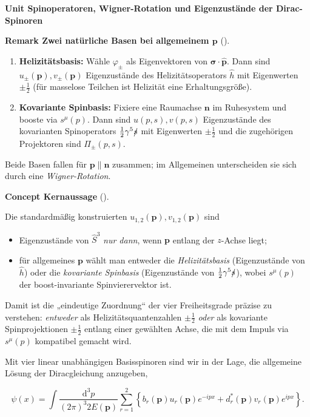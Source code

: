 \documentclass[10pt, letterpaper]{article}
\newcommand{\CustomHeading}[3]{%
  \par\medskip\noindent%
  \textbf{#1 #2} \textnormal{(#3)}.\enskip%
}
\newenvironment{REM}[2]{\begin{unitbox}\CustomHeading{Remark}{#1}{#2}}{\end{unitbox}}
\newenvironment{CONC}[2]{\begin{unitbox}\CustomHeading{Concept}{#1}{#2}}{\end{unitbox}}
\newenvironment{unit}[1]
  {\begin{unitbox}\textbf{Unit #1}\par\smallskip}
  {\end{unitbox}}
\begin{document}
\begin{unit}{Spinoperatoren, Wigner-Rotation und Eigenzustände der Dirac-Spinoren}
\begin{REM}{Zwei natürliche Basen bei allgemeinem $\mathbf p$}{}
\begin{enumerate}[label=\roman*)]
\item \textbf{Helizitätsbasis:} Wähle $\varphi_\pm$ als Eigenvektoren von $\boldsymbol{\sigma}\cdot \hat{\mathbf p}$. Dann sind $u_\pm(\mathbf p),v_\pm(\mathbf p)$ Eigenzustände des Helizitätsoperators $\hat h$ mit Eigenwerten $\pm\tfrac12$ (für masselose Teilchen ist Helizität eine Erhaltungsgröße).
\item \textbf{Kovariante Spinbasis:} Fixiere eine Raumachse $\mathbf n$ im Ruhesystem und booste via $s^\mu(p)$. Dann sind $u(p,s),v(p,s)$ Eigenzustände des kovarianten Spinoperators $\tfrac12\gamma^5\slashed{s}$ mit Eigenwerten $\pm\tfrac12$ und die zugehörigen Projektoren sind $\Pi_\pm(p,s)$.
\end{enumerate}
Beide Basen fallen für $\mathbf p\parallel\mathbf n$ zusammen; im Allgemeinen unterscheiden sie sich durch eine \emph{Wigner-Rotation}.
\end{REM}

\begin{CONC}{Kernaussage}{}
Die standardmäßig konstruierten $u_{1,2}(\mathbf p),v_{1,2}(\mathbf p)$ sind
\begin{itemize}
\item Eigenzustände von $\hat S^3$ \emph{nur dann}, wenn $\mathbf p$ entlang der $z$-Achse liegt;
\item für allgemeines $\mathbf p$ wählt man entweder die \emph{Helizitätsbasis} (Eigenzustände von $\hat h$) oder die \emph{kovariante Spinbasis} (Eigenzustände von $\tfrac12\gamma^5\slashed{s}$), wobei $s^\mu(p)$ der boost-invariante Spinvierervektor ist.
\end{itemize}
Damit ist die „eindeutige Zuordnung“ der vier Freiheitsgrade präzise zu verstehen: \emph{entweder} als Helizitätsquantenzahlen $\pm\tfrac12$ \emph{oder} als kovariante Spinprojektionen $\pm\tfrac12$ entlang einer gewählten Achse, die mit dem Impuls via $s^\mu(p)$ kompatibel gemacht wird.
\end{CONC}

\end{unit}


Mit vier linear unabhängigen Basisspinoren sind wir in der Lage, die allgemeine Lösung der Diracgleichung anzugeben,

$$
\psi(x)=\int \frac{\mathrm{d}^{3} p}{(2 \pi)^{3} 2 E(\mathbf{p})} \sum_{r=1}^{2}\left\{b_{r}(\mathbf{p}) u_{r}(\mathbf{p}) e^{-i p x}+d_{r}^{*}(\mathbf{p}) v_{r}(\mathbf{p}) e^{i p x}\right\} .
$$
\end{document}
